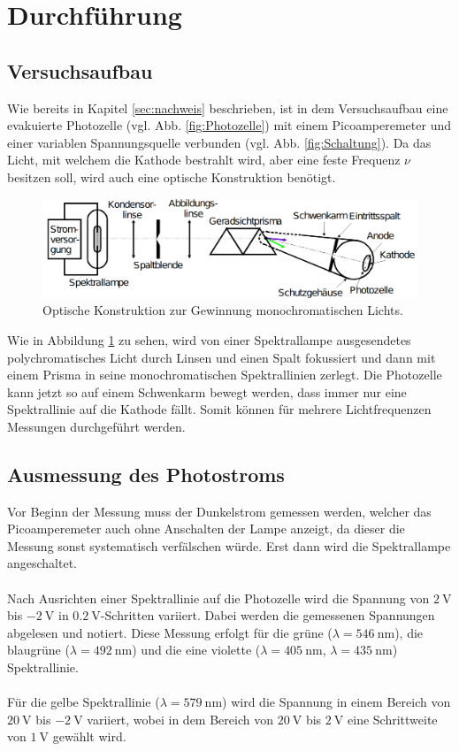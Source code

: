 \section{Durchführung}
\label{sec:Durchführung}

\subsection{Versuchsaufbau}
\label{sec:Aufbau}
Wie bereits in Kapitel \ref{sec:nachweis} beschrieben, ist in dem Versuchsaufbau eine evakuierte Photozelle (vgl. Abb. \ref{fig:Photozelle}) mit einem
Picoamperemeter und einer variablen Spannungsquelle verbunden (vgl. Abb. \ref{fig:Schaltung}). Da das Licht, mit welchem die Kathode
bestrahlt wird, aber eine feste Frequenz $\nu$ besitzen soll, wird auch eine optische Konstruktion benötigt.
\begin{figure}
    \centering
    \includegraphics[scale=0.3]{pictures/OptischerTeil.png}
    \caption{Optische Konstruktion zur Gewinnung monochromatischen Lichts. \cite{AP01}}
    \label{fig:optisch}
\end{figure}
Wie in Abbildung \ref{fig:optisch} zu sehen, wird von einer
Spektrallampe ausgesendetes polychromatisches Licht durch Linsen und einen Spalt fokussiert und dann mit einem Prisma in seine monochromatischen
Spektrallinien zerlegt. Die Photozelle kann jetzt so auf einem Schwenkarm bewegt werden, dass immer nur eine Spektrallinie auf die Kathode
fällt. Somit können für mehrere Lichtfrequenzen Messungen durchgeführt werden.

\subsection{Ausmessung des Photostroms}
\label{sec:ausmessen}
Vor Beginn der Messung muss der Dunkelstrom gemessen werden, welcher das Picoamperemeter auch ohne Anschalten der Lampe anzeigt, da dieser
die Messung sonst systematisch verfälschen würde. Erst dann wird die Spektrallampe angeschaltet.
\\
\\
\noindent
Nach Ausrichten einer Spektrallinie auf die Photozelle wird die Spannung von $\SI{2}{\volt}$ bis
$\SI{-2}{\volt}$ in $\SI{0.2}{\volt}$-Schritten variiert. Dabei werden die gemessenen Spannungen abgelesen und notiert. Diese Messung
erfolgt für die grüne ($\lambda=\SI{546}{\nano\metre}$), die blaugrüne ($\lambda=\SI{492}{\nano\metre}$) und die eine violette
($\lambda=\SI{405}{\nano\metre}$, $\lambda=\SI{435}{\nano\metre}$) Spektrallinie.
\\
\\
\noindent
Für die gelbe Spektrallinie ($\lambda=\SI{579}{\nano\metre}$) wird die Spannung in einem Bereich von $\SI{20}{\volt}$ bis $\SI{-2}{\volt}$
variiert, wobei in dem Bereich von $\SI{20}{\volt}$ bis $\SI{2}{\volt}$ eine Schrittweite von $\SI{1}{\volt}$ gewählt wird.
